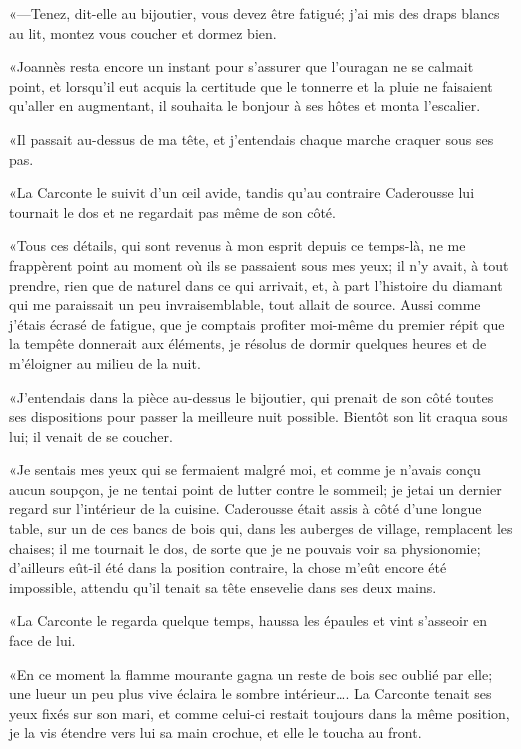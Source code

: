 «—Tenez, dit-elle au bijoutier, vous devez être fatigué; j'ai mis des draps blancs au lit, montez vous coucher et dormez bien. 

«Joannès resta encore un instant pour s'assurer que l'ouragan ne se calmait point, et lorsqu'il eut acquis la certitude que le tonnerre et la pluie ne faisaient qu'aller en augmentant, il souhaita le bonjour à ses hôtes et monta l'escalier. 

«Il passait au-dessus de ma tête, et j'entendais chaque marche craquer sous ses pas. 

«La Carconte le suivit d'un œil avide, tandis qu'au contraire Caderousse lui tournait le dos et ne regardait pas même de son côté.  

«Tous ces détails, qui sont revenus à mon esprit depuis ce temps-là, ne me frappèrent point au moment où ils se passaient sous mes yeux; il n'y avait, à tout prendre, rien que de naturel dans ce qui arrivait, et, à part l'histoire du diamant qui me paraissait un peu invraisemblable, tout allait de source. Aussi comme j'étais écrasé de fatigue, que je comptais profiter moi-même du premier répit que la tempête donnerait aux éléments, je résolus de dormir quelques heures et de m'éloigner au milieu de la nuit. 

«J'entendais dans la pièce au-dessus le bijoutier, qui prenait de son côté toutes ses dispositions pour passer la meilleure nuit possible. Bientôt son lit craqua sous lui; il venait de se coucher.  

«Je sentais mes yeux qui se fermaient malgré moi, et comme je n'avais conçu aucun soupçon, je ne tentai point de lutter contre le sommeil; je jetai un dernier regard sur l'intérieur de la cuisine. Caderousse était assis à côté d'une longue table, sur un de ces bancs de bois qui, dans les auberges de village, remplacent les chaises; il me tournait le dos, de sorte que je ne pouvais voir sa physionomie; d'ailleurs eût-il été dans la position contraire, la chose m'eût encore été impossible, attendu qu'il tenait sa tête ensevelie dans ses deux mains. 

«La Carconte le regarda quelque temps, haussa les épaules et vint s'asseoir en face de lui. 

«En ce moment la flamme mourante gagna un reste de bois sec oublié par elle; une lueur un peu plus vive éclaira le sombre intérieur\dots. La Carconte tenait ses yeux fixés sur son mari, et comme celui-ci restait toujours dans la même position, je la vis étendre vers lui sa main crochue, et elle le toucha au front. 

